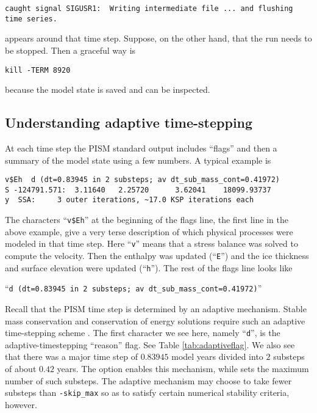 \begin{verbatim}
caught signal SIGUSR1:  Writing intermediate file ... and flushing time series.
\end{verbatim}
\noindent appears around that time step.  Suppose, on the other hand, that the run needs to be stopped.  Then a graceful way is

\begin{verbatim}
kill -TERM 8920
\end{verbatim}

\noindent because the model state is saved and can be inspected.



\subsection{Understanding adaptive time-stepping} \label{subsect:adapt}

At each time step the PISM standard output includes ``flags'' and then a summary of the model state using a few numbers.  A typical example is
\small
\begin{verbatim}
v$Eh  d (dt=0.83945 in 2 substeps; av dt_sub_mass_cont=0.41972)
S -124791.571:  3.11640   2.25720      3.62041    18099.93737
y  SSA:     3 outer iterations, ~17.0 KSP iterations each
\end{verbatim}
\normalsize

The characters ``\texttt{v\$Eh}'' at the beginning of the flags line, the first line in the above example, give a very terse description of which physical processes were modeled in that time step.  Here ``\texttt{v}'' means that a stress balance was solved to compute the velocity.  Then the enthalpy was updated (``\texttt{E}'') and the ice thickness and surface elevation were updated (``\texttt{h}'').  The rest of the flags line looks like

  ``\texttt{d (dt=0.83945 in 2 substeps; av dt_sub_mass_cont=0.41972)}''

\noindent Recall that the PISM time step is determined by an
adaptive mechanism.  Stable mass conservation and conservation of energy solutions
require such an adaptive time-stepping scheme \cite{BBL}.  The first character
we see here, namely ``\texttt{d}'', is the adaptive-timestepping ``reason''
flag.  See Table \ref{tab:adaptiveflag}.  We also see that
there was a major time step of $0.83945$ model years divided into $2$ substeps of
about $0.42$ years.  The  option enables this mechanism, while
 sets the maximum number of such substeps.  The adaptive
mechanism may choose to take fewer substeps than \texttt{-skip_max} so as to
satisfy certain numerical stability criteria, however.

